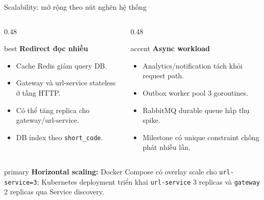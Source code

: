 \documentclass[aspectratio=169]{beamer}
\begin{document}
\begin{frame}{Scalability: mở rộng theo nút nghẽn hệ thống}
    \begin{columns}[T,onlytextwidth]
        \begin{column}{0.48\textwidth}
            \begin{claimbox}{best}
                \textbf{Redirect đọc nhiều}
                \begin{itemize}\small
                    \item Cache Redis giảm query DB.
                    \item Gateway và url-service stateless ở tầng HTTP.
                    \item Có thể tăng replica cho gateway/url-service.
                    \item DB index theo \texttt{short\_code}.
                \end{itemize}
            \end{claimbox}
        \end{column}
        \begin{column}{0.48\textwidth}
            \begin{claimbox}{accent}
                \textbf{Async workload}
                \begin{itemize}\small
                    \item Analytics/notification tách khỏi request path.
                    \item Outbox worker pool 3 goroutines.
                    \item RabbitMQ durable queue hấp thụ spike.
                    \item Milestone có unique constraint chống phát nhiều lần.
                \end{itemize}
            \end{claimbox}
        \end{column}
    \end{columns}
    \vspace{0.35cm}
    \begin{claimbox}{primary}
        \small \textbf{Horizontal scaling:} Docker Compose có overlay scale cho \texttt{url-service=3}; Kubernetes deployment triển khai \texttt{url-service} 3 replicas và \texttt{gateway} 2 replicas qua Service discovery.
    \end{claimbox}
\end{frame}
\end{document}
